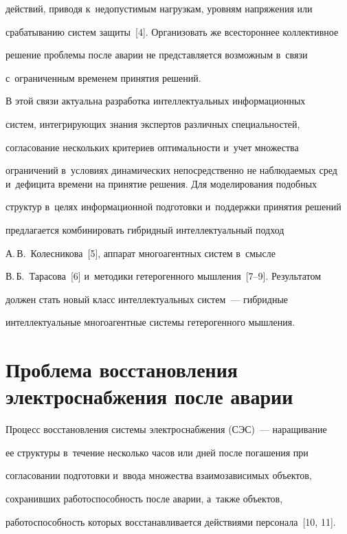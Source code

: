 действий, приводя к~недопустимым нагрузкам, уровням напряжения или 


срабатыванию систем защиты~[4]. Организовать же всестороннее коллективное 


решение проблемы после аварии не представляется возможным в~связи 


с~ограниченным временем принятия решений.


  


  В этой связи актуальна разработка интеллектуальных информационных 


сис\-тем, интегрирующих знания экспертов различных специальностей, 


согласование нескольких критериев оптимальности и~учет множества 


ограничений в~условиях динамических непосредственно не наблюдаемых сред и~дефицита времени на принятие решения. Для моделирования подобных 


структур в~целях информационной подготовки и~поддержки принятия решений 


предлагается комбинировать гибридный интеллектуальный подход 


А.\,В.~Колесникова~[5], аппарат многоагентных систем в~смысле 


В.\,Б.~Тарасова~[6] и~методики гетерогенного мышления~[7--9]. Результатом 


должен стать новый класс интеллектуальных систем~--- гибридные 


интеллектуальные многоагентные системы гетерогенного мышления.


  


  \section{Проблема восстановления электроснабжения после аварии}


  


  Процесс восстановления системы электроснабжения (СЭС)~--- наращивание 


ее структуры в~течение несколько часов или дней после погашения при 


согласовании подготовки и~ввода множества взаимозависимых объектов, 


сохранивших работоспособность после аварии, а~также объектов, 


работоспособность которых восстанавливается действиями персонала~[10, 11]. 


